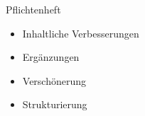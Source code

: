 \documentclass[ignorenonframetext, 11pt, table]{beamer}
\begin{document}

\begin{frame}{Pflichtenheft}
\begin{itemize}
\item<2-> Inhaltliche Verbesserungen
\item<3-> Ergänzungen
\item<4-> Verschönerung
\item<5-> Strukturierung
\end{itemize}
\end{frame}
\end{document}
